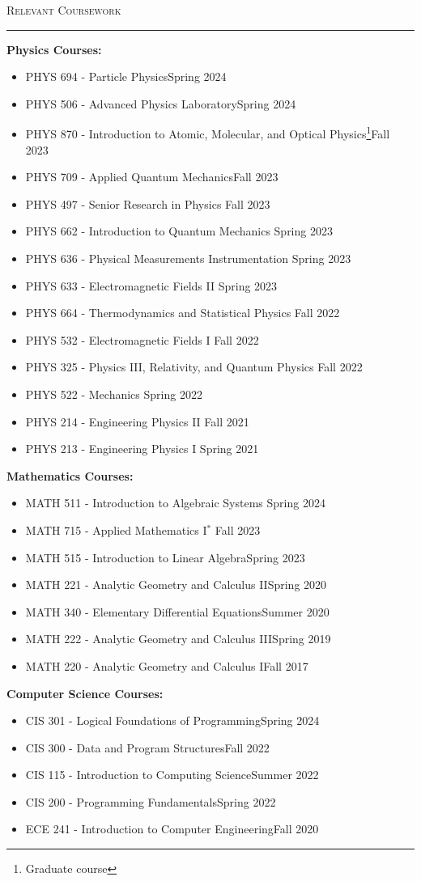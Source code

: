 \documentclass{article}
\newcommand{\sect}[1]{
\noindent\large{\textsc{#1}}\\[-6pt]\normalsize{\noindent\rule{\textwidth}{0.5pt}}
}
\begin{document}
\newpage
\sect{Relevant Coursework}
\textbf{Physics Courses:}\begin{itemize}
	\item PHYS 694 - Particle Physics\hfill Spring 2024
	\item PHYS 506 - Advanced Physics Laboratory\hfill Spring 2024
	\item PHYS 870 - Introduction to Atomic, Molecular, and Optical Physics\footnote[1]{Graduate course}\hfill Fall 2023
	\item PHYS 709 - Applied Quantum Mechanics\hfill Fall 2023
	\item PHYS 497 - Senior Research in Physics \hfill Fall 2023
	\item PHYS 662 - Introduction to Quantum Mechanics \hfill Spring 2023
	\item PHYS 636 - Physical Measurements Instrumentation \hfill Spring 2023
	\item PHYS 633 - Electromagnetic Fields II \hfill Spring 2023
	\item PHYS 664 - Thermodynamics and Statistical Physics \hfill Fall 2022
	\item PHYS 532 - Electromagnetic Fields I \hfill Fall 2022
	\item PHYS 325 - Physics III, Relativity, and Quantum Physics \hfill Fall 2022
	\item PHYS 522 - Mechanics \hfill Spring 2022
	\item PHYS 214 - Engineering Physics II \hfill Fall 2021
	\item PHYS 213 - Engineering Physics I \hfill Spring 2021\\[-12pt]
\end{itemize}
\textbf{Mathematics Courses:}
\begin{itemize}
	\item MATH 511 - Introduction to Algebraic Systems \hfill Spring 2024
	\item MATH 715 - Applied Mathematics I$ ^* $ \hfill Fall 2023
	\item MATH 515 - Introduction to Linear Algebra\hfill Spring 2023
	\item MATH 221 - Analytic Geometry and Calculus II\hfill Spring 2020
	\item MATH 340 - Elementary Differential Equations\hfill Summer 2020
	\item MATH 222 - Analytic Geometry and Calculus III\hfill Spring 2019
	\item MATH 220 - Analytic Geometry and Calculus I\hfill Fall 2017\\[-12pt]
\end{itemize}
\textbf{Computer Science Courses:}
\begin{itemize}
	\item CIS 301 - Logical Foundations of Programming\hfill Spring 2024
	\item CIS 300 - Data and Program Structures\hfill Fall 2022
	\item CIS 115 - Introduction to Computing Science\hfill Summer 2022
	\item CIS 200 - Programming Fundamentals\hfill Spring 2022
	\item ECE 241 - Introduction to Computer Engineering\hfill Fall 2020\\[0pt]
\end{itemize}
\end{document}
